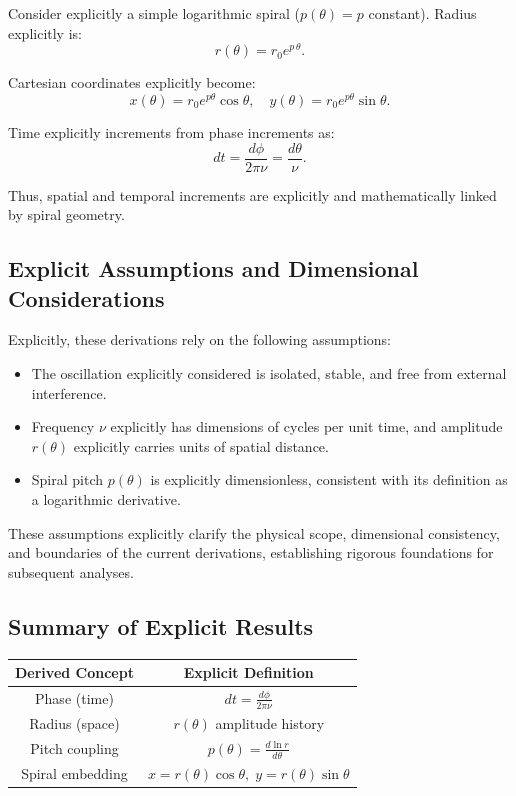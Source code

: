 Consider explicitly a simple logarithmic spiral ($p(\theta)=p$ constant). Radius explicitly is:
\begin{equation}
    r(\theta)=r_0 e^{p\,\theta}.
\end{equation}

Cartesian coordinates explicitly become:
\begin{equation}
    x(\theta)=r_0 e^{p\theta}\cos\theta,\quad y(\theta)=r_0 e^{p\theta}\sin\theta.
\end{equation}

Time explicitly increments from phase increments as:
\begin{equation}
    dt=\frac{d\phi}{2\pi\nu}=\frac{d\theta}{\nu}.
\end{equation}

Thus, spatial and temporal increments are explicitly and mathematically linked by spiral geometry.

\subsection{Explicit Assumptions and Dimensional Considerations}

Explicitly, these derivations rely on the following assumptions:
\begin{itemize}
    \item The oscillation explicitly considered is isolated, stable, and free from external interference.
    \item Frequency $\nu$ explicitly has dimensions of cycles per unit time, and amplitude $r(\theta)$ explicitly carries units of spatial distance.
    \item Spiral pitch $p(\theta)$ is explicitly dimensionless, consistent with its definition as a logarithmic derivative.
\end{itemize}

These assumptions explicitly clarify the physical scope, dimensional consistency, and boundaries of the current derivations, establishing rigorous foundations for subsequent analyses.

\subsection{Summary of Explicit Results}

\begin{center}
\begin{tabular}{|c|c|}
\hline
\textbf{Derived Concept} & \textbf{Explicit Definition} \\ \hline
Phase (time)     & $dt=\frac{d\phi}{2\pi\nu}$ \\ \hline
Radius (space)   & $r(\theta)$ amplitude history \\ \hline
Pitch coupling   & $p(\theta)=\frac{d\ln r}{d\theta}$ \\ \hline
Spiral embedding & $x=r(\theta)\cos\theta,\; y=r(\theta)\sin\theta$ \\ \hline
\end{tabular}
\end{center}

